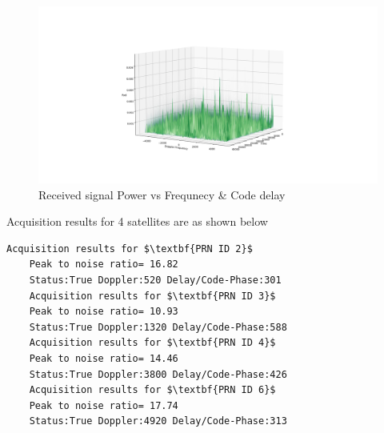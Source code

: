 \documentclass[conference]{IEEEtran}
\begin{document}
\begin{figure}[ht]
	\centering
	\includegraphics[width=1\columnwidth]{figs/acq_output.png}
	\centering
	\caption{Received signal Power vs Frequnecy \& Code delay}
	\label{fig:acq_output}
\end{figure}

Acquisition results for 4 satellites are as shown below
\begin{lstlisting}[mathescape=true]
	Acquisition results for $\textbf{PRN ID 2}$
	Peak to noise ratio= 16.82
 	Status:True Doppler:520 Delay/Code-Phase:301
	Acquisition results for $\textbf{PRN ID 3}$
	Peak to noise ratio= 10.93
 	Status:True Doppler:1320 Delay/Code-Phase:588
	Acquisition results for $\textbf{PRN ID 4}$
	Peak to noise ratio= 14.46
 	Status:True Doppler:3800 Delay/Code-Phase:426
	Acquisition results for $\textbf{PRN ID 6}$
	Peak to noise ratio= 17.74
 	Status:True Doppler:4920 Delay/Code-Phase:313
\end{lstlisting}
\end{document}
